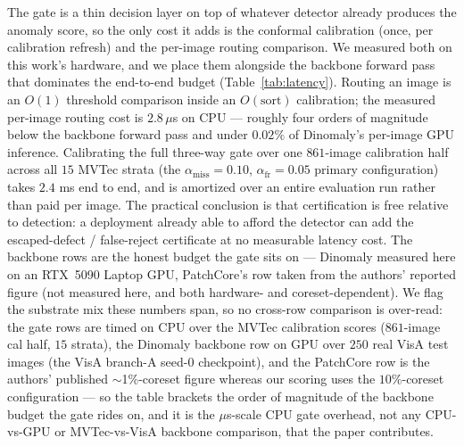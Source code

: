 \documentclass[11pt]{article}
\begin{document}
The gate is a thin decision layer on top of whatever detector already produces the anomaly score,
so the only cost it adds is the conformal calibration (once, per calibration refresh) and the
per-image routing comparison. We measured both on this work's hardware, and we place them
alongside the backbone forward pass that dominates the end-to-end budget
(Table~\ref{tab:latency}). Routing an image is an $O(1)$ threshold comparison inside an
$O(\text{sort})$ calibration; the measured per-image routing cost is $2.8\,\mu$s on CPU ---
roughly four orders of magnitude below the backbone forward pass and under $0.02\%$ of Dinomaly's
per-image GPU inference. Calibrating the full three-way gate over one $861$-image calibration half
across all $15$ MVTec strata (the $\alpha_{\text{miss}}=0.10$, $\alpha_{\text{fr}}=0.05$ primary
configuration) takes $2.4$ ms end to end, and is amortized over an entire evaluation run rather
than paid per image. The practical conclusion is that certification is free relative to detection:
a deployment already able to afford the detector can add the escaped-defect / false-reject
certificate at no measurable latency cost. The backbone rows are the honest budget the gate sits
on --- Dinomaly measured here on an RTX~5090 Laptop GPU, PatchCore's row taken from the authors'
reported figure (not measured here, and both hardware- and coreset-dependent). We flag the
substrate mix these numbers span, so no cross-row comparison is over-read: the gate rows are timed
on CPU over the MVTec calibration scores ($861$-image cal half, $15$ strata), the Dinomaly backbone
row on GPU over $250$ real VisA test images (the VisA branch-A seed-$0$ checkpoint), and the
PatchCore row is the authors' published $\sim$1\%-coreset figure whereas our scoring uses the
$10\%$-coreset configuration --- so the table brackets the order of magnitude of the
backbone budget the gate rides on, and it is the $\mu$s-scale CPU gate overhead, not any
CPU-vs-GPU or MVTec-vs-VisA backbone comparison, that the paper contributes.
\end{document}
